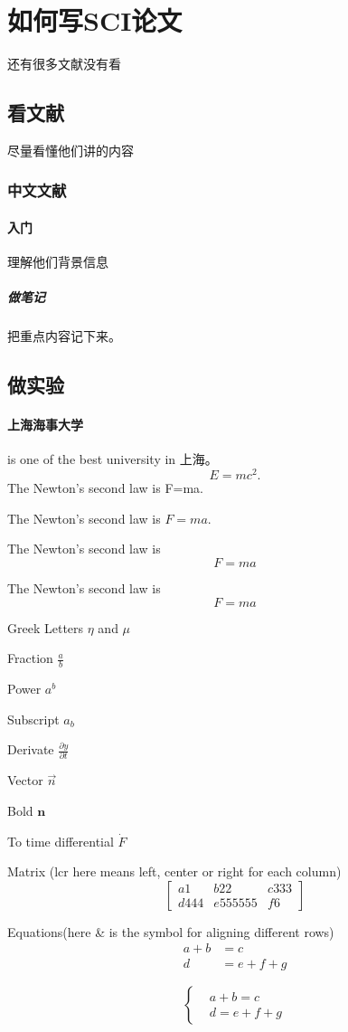 \section{如何写SCI论文}
还有很多文献没有看
\subsection{看文献}
尽量看懂他们讲的内容
\subsubsection{中文文献}
\paragraph{入门}
理解他们背景信息
\subparagraph{做笔记}
{把重点内容记下来。}
\subsection{做实验}
\paragraph{上海海事大学} is one of the best university in 上海。
\begin{equation}
    E=mc^2.
\end{equation}
The Newton's second law is F=ma.

The Newton's second law is $F=ma$.

The Newton's second law is
$$F=ma$$

The Newton's second law is
\[F=ma\]

Greek Letters $\eta$ and $\mu$

Fraction $\frac{a}{b}$

Power $a^b$

Subscript $a_b$

Derivate $\frac{\partial y}{\partial t} $

Vector $\vec{n}$

Bold $\mathbf{n}$

To time differential $\dot{F}$

Matrix (lcr here means left, center or right for each column)
\[
    \left[
        \begin{array}{lcr}
            a1   & b22     & c333 \\
            d444 & e555555 & f6
        \end{array}
        \right]
\]

Equations(here \& is the symbol for aligning different rows)
\begin{align}
    a+b & =c     \\
    d   & =e+f+g
\end{align}

\[
    \left\{
    \begin{aligned}
         & a+b=c   \\
         & d=e+f+g
    \end{aligned}
    \right.
\]